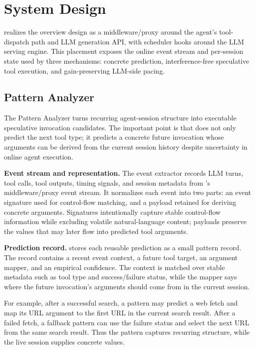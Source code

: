 \section{System Design}
\label{sec:design}

\sys realizes the overview design as a middleware/proxy around the agent's tool-dispatch path and LLM generation API, with scheduler hooks around the LLM serving engine.
This placement exposes the online event stream and per-session state used by three mechanisms: concrete prediction, interference-free speculative tool execution, and gain-preserving LLM-side pacing.

\subsection{Pattern Analyzer}
\label{sec:design-pattern-analyzer}

The Pattern Analyzer turns recurring agent-session structure into executable speculative invocation candidates.
The important point is that \sys does not only predict the next tool type; it predicts a concrete future invocation whose arguments can be derived from the current session history despite uncertainty in online agent execution.

\noindent\textbf{Event stream and representation.}
The event extractor records LLM turns, tool calls, tool outputs, timing signals, and session metadata from \sys's middleware/proxy event stream.
It normalizes each event into two parts: an event signature used for control-flow matching, and a payload retained for deriving concrete arguments.
Signatures intentionally capture stable control-flow information while excluding volatile natural-language content; payloads preserve the values that may later flow into predicted tool arguments.

\noindent\textbf{Prediction record.}
\sys stores each reusable prediction as a small pattern record.
The record contains a recent event context, a future tool target, an argument mapper, and an empirical confidence.
The context is matched over stable metadata such as tool type and success/failure status, while the mapper says where the future invocation's arguments should come from in the current session.

For example, after a successful search, a pattern may predict a web fetch and map its URL argument to the first URL in the current search result.
After a failed fetch, a fallback pattern can use the failure status and select the next URL from the same search result.
Thus the pattern captures recurring structure, while the live session supplies concrete values.

